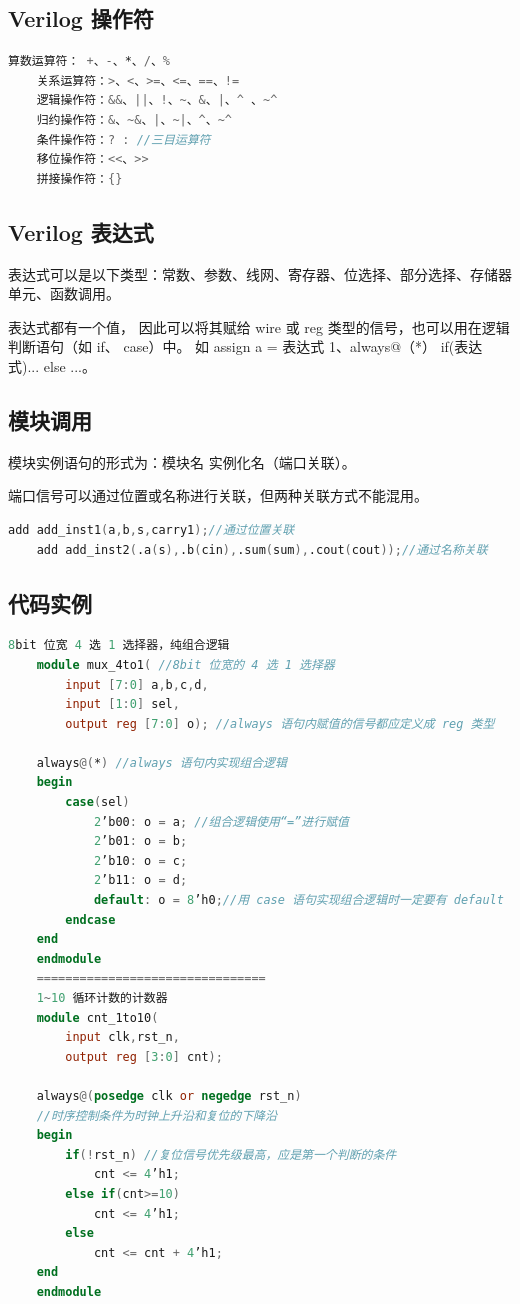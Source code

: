 \documentclass[UTF8]{article}
\begin{document}
	
	\subsection{Verilog 操作符}
	\begin{lstlisting}[language=Verilog]
	算数运算符： +、-、*、/、%
	关系运算符：>、<、>=、<=、==、!=
	逻辑操作符：&&、||、!、~、&、|、^ 、~^
	归约操作符：&、~&、|、~|、^、~^
	条件操作符：? : //三目运算符
	移位操作符：<<、>>
	拼接操作符：{}
	\end{lstlisting}
	
	
	\subsection{Verilog 表达式}
	表达式可以是以下类型：常数、参数、线网、寄存器、位选择、部分选择、存储器单元、函数调用。\par
	表达式都有一个值， 因此可以将其赋给 wire 或 reg 类型的信号，也可以用在逻辑判断语句（如 if、 case）中。 如 assign a = 表达式 1、always@（*） if(表达式)... else ...。
	
	
	
	\subsection{模块调用}
	模块实例语句的形式为：模块名 实例化名（端口关联）。\par
	端口信号可以通过位置或名称进行关联，但两种关联方式不能混用。 
	\begin{lstlisting}[language=Verilog]
	add add_inst1(a,b,s,carry1);//通过位置关联
	add add_inst2(.a(s),.b(cin),.sum(sum),.cout(cout));//通过名称关联
	\end{lstlisting}
	
	
	
	\subsection{代码实例}
	\begin{lstlisting}[language=Verilog]
	8bit 位宽 4 选 1 选择器，纯组合逻辑
	module mux_4to1( //8bit 位宽的 4 选 1 选择器
		input [7:0] a,b,c,d,
		input [1:0] sel,
		output reg [7:0] o); //always 语句内赋值的信号都应定义成 reg 类型
		
	always@(*) //always 语句内实现组合逻辑
	begin
		case(sel)
			2’b00: o = a; //组合逻辑使用“=”进行赋值
			2’b01: o = b;
			2’b10: o = c;
			2’b11: o = d;
			default: o = 8’h0;//用 case 语句实现组合逻辑时一定要有 default
		endcase
	end
	endmodule
	================================
	1~10 循环计数的计数器
	module cnt_1to10(
		input clk,rst_n,
		output reg [3:0] cnt);
		
	always@(posedge clk or negedge rst_n)
	//时序控制条件为时钟上升沿和复位的下降沿
	begin
		if(!rst_n) //复位信号优先级最高，应是第一个判断的条件
			cnt <= 4’h1;
		else if(cnt>=10)
			cnt <= 4’h1;
		else
			cnt <= cnt + 4’h1;
	end
	endmodule
	\end{lstlisting}
	
\end{document}
